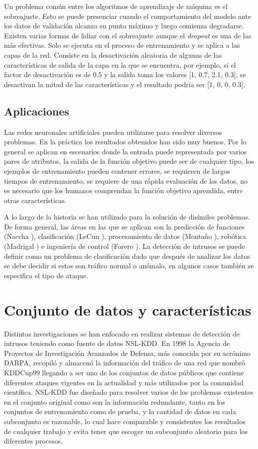 Un problema común entre los algoritmos de aprendizaje de máquina es el sobreajuste. Esto se puede presenciar cuando el comportamiento del modelo ante los datos de validación alcanza su punto máximo y luego comienza degradarse. Existen varias formas de lidiar con el sobreajuste aunque el \textit{dropout} es una de las más efectivas. Solo se ejecuta en el proceso de entrenamiento y se aplica a las capas de la red. Consiste en la desactivaci\'on aleatoria de algunas de las características de salida de la capa en la que se encuentra, por ejemplo, si el factor de desactivaci\'on es de $0.5$ y la salida toma los valores [1, 0.7, 2.1,  0.3], se desactivan la mitad de las características y el resultado podría ser [1, 0, 0, 0.3].

\subsection{Aplicaciones}
Las redes neuronales artificiales pueden utilizarse para resolver diversos problemas. En la práctica los resultados obtenidos han sido muy buenos. Por lo general se aplican en escenarios donde la entrada puede representada por varios pares de atributos, la salida de la función objetivo puede ser de cualquier tipo, los ejemplos de entrenamiento pueden contener errores, se requieren de largos tiempos de entrenamiento, se requiere de una rápida evaluación de los datos, no es necesario que los humanos comprendan la función objetivo aprendida, entre otras características.

A lo largo de la historia se han utilizado para la solución de disímiles problemas. De forma general, las áreas en las que se aplican son la predicción de funciones (Naccha \cite{naccha2012prediction}), clasificación (LeCun \cite{lecun1995comparison}), procesamiento de datos (Monta\~no \cite{montano2017redes}), robótica (Madrigal \cite{madrigal2002robots}) e ingeniería de control (Forero \cite{forero2013control}). La detección de intrusos se puede definir como un problema de clasificación dado que después de analizar los datos se debe decidir si estos son tráfico normal o anómalo, en algunos casos también se especifica el tipo de ataque.

\section{Conjunto de datos y características}
Distintas investigaciones se han enfocado en realizar sistemas de detección de intrusos teniendo como fuente de datos NSL-KDD. En 1998 la Agencia de Proyectos de Investigación Avanzados de Defensa, más conocida por su acrónimo DARPA, recopiló y almacenó la información del tráfico de una red que nombró KDDCup99 llegando a ser uno de los conjuntos de datos públicos que contiene diferentes ataques vigentes en la actualidad y más utilizados por la comunidad científica. NSL-KDD fue diseñado para resolver varios de los problemas existentes en el conjunto original como son la información redundante, tanto en los conjuntos de entrenamiento como de prueba, y la cantidad de datos en cada subconjunto es razonable, lo cual hace comparable y consistentes los resultados de cualquier trabajo y evita tener que escoger un subconjunto aleatorio para los diferentes procesos.

